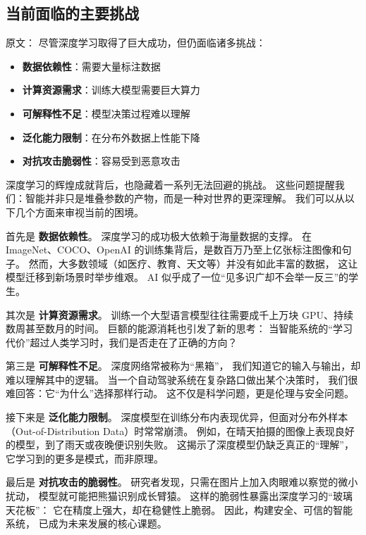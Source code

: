 \subsection{当前面临的主要挑战}

原文：
尽管深度学习取得了巨大成功，但仍面临诸多挑战：
\begin{itemize}
\item {\bf 数据依赖性}：需要大量标注数据
\item {\bf 计算资源需求}：训练大模型需要巨大算力
\item {\bf 可解释性不足}：模型决策过程难以理解
\item {\bf 泛化能力限制}：在分布外数据上性能下降
\item {\bf 对抗攻击脆弱性}：容易受到恶意攻击
\end{itemize}
深度学习的辉煌成就背后，也隐藏着一系列无法回避的挑战。  
这些问题提醒我们：智能并非只是堆叠参数的产物，而是一种对世界的更深理解。  
我们可以从以下几个方面来审视当前的困境。  

首先是 {\bf 数据依赖性}。  
深度学习的成功极大依赖于海量数据的支撑。  
在 ImageNet、COCO、OpenAI 的训练集背后，是数百万乃至上亿张标注图像和句子。  
然而，大多数领域（如医疗、教育、天文等）并没有如此丰富的数据，  
这让模型迁移到新场景时举步维艰。  
AI 似乎成了一位“见多识广却不会举一反三”的学生。  

其次是 {\bf 计算资源需求}。  
训练一个大型语言模型往往需要成千上万块 GPU、持续数周甚至数月的时间。  
巨额的能源消耗也引发了新的思考：  
当智能系统的“学习代价”超过人类学习时，我们是否走在了正确的方向？  

第三是 {\bf 可解释性不足}。  
深度网络常被称为“黑箱”，  
我们知道它的输入与输出，却难以理解其中的逻辑。  
当一个自动驾驶系统在复杂路口做出某个决策时，  
我们很难回答：它“为什么”选择那样行动。  
这不仅是科学问题，更是伦理与安全问题。  

接下来是 {\bf 泛化能力限制}。  
深度模型在训练分布内表现优异，但面对分布外样本（Out-of-Distribution Data）时常常崩溃。  
例如，在晴天拍摄的图像上表现良好的模型，到了雨天或夜晚便识别失败。  
这揭示了深度模型仍缺乏真正的“理解”，  
它学习到的更多是模式，而非原理。  

最后是 {\bf 对抗攻击的脆弱性}。  
研究者发现，只需在图片上加入肉眼难以察觉的微小扰动，  
模型就可能把熊猫识别成长臂猿。  
这样的脆弱性暴露出深度学习的“玻璃天花板”：  
它在精度上强大，却在稳健性上脆弱。  
因此，构建安全、可信的智能系统，  
已成为未来发展的核心课题。


